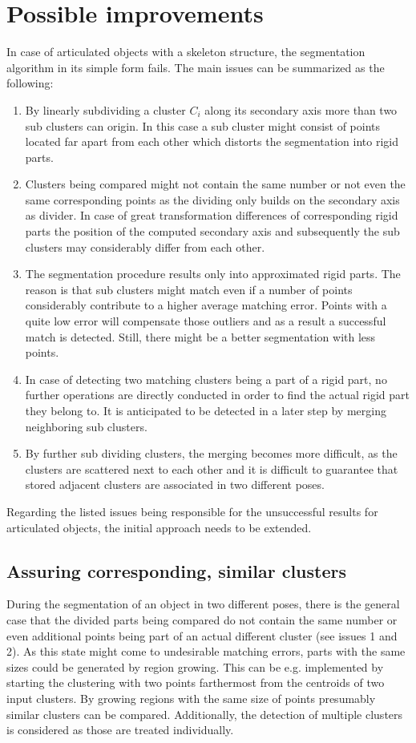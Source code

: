 \section{Possible improvements}
In case of articulated objects with a skeleton structure, the segmentation algorithm in its simple form fails. The main issues can be summarized as the following:
\begin{enumerate}
	\item By linearly subdividing a cluster $C_i$ along its secondary axis more than two sub clusters can origin. In this case a sub cluster might consist of points located far apart from each other which distorts the segmentation into rigid parts.
	\item Clusters being compared might not contain the same number or not even the same corresponding points as the dividing only builds on the secondary axis as divider. In case of great transformation differences of corresponding rigid parts the position of the computed secondary axis and subsequently the sub clusters may considerably differ from each other.
	\item The segmentation procedure results only into approximated rigid parts. The reason is that sub clusters might match even if a number of points considerably contribute to a higher average matching error. Points with a quite low error will compensate those outliers and as a result a successful match is detected. Still, there might be a better segmentation with less points.
	\item In case of detecting two matching clusters being a part of a rigid part, no further operations are directly conducted in order to find the actual rigid part they belong to. It is anticipated to be detected in a later step by merging neighboring sub clusters.
	\item By further sub dividing clusters, the merging becomes more difficult, as the clusters are scattered next to each other and it is difficult to guarantee that stored adjacent clusters are associated in two different poses.
\end{enumerate}
Regarding the listed issues being responsible for the unsuccessful results for articulated objects, the initial approach needs to be extended. 

\subsection{Assuring corresponding, similar clusters}
During the segmentation of an object in two different poses, there is the general case that the divided parts being compared do not contain the same number or even additional points being part of an actual different cluster (see issues 1 and 2). As this state might come to undesirable matching errors, parts with the same sizes could be generated by region growing. This can be e.g. implemented by starting the clustering with two points farthermost from the centroids of two input clusters. By growing regions with the same size of points presumably similar clusters can be compared. Additionally, the detection of multiple clusters is considered as those are treated individually.

